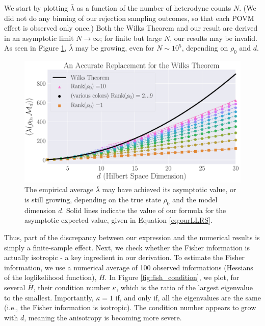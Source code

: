 \documentclass[aps,pra, twocolumn]{revtex4}
\begin{document}
We start by plotting $\bar{\lambda}$ as a function of the number of heterodyne counts $N$. (We did not do any binning of our rejection sampling outcomes, so that each POVM effect is observed only once.) Both the Wilks 
Theorem and our result are derived in an asymptotic limit $N \rightarrow \infty$; for finite but large $N$, our results may be invalid. 
As seen in Figure \ref{fig:totalcontrib}, $\bar{\lambda}$ may be growing, even for $N \sim 10^{5}$, depending on $\rho_{0}$ and $d$.
\begin{figure}[h]
  \includegraphics[width=\columnwidth]{Images/Figure_9.pdf}
 \caption{The empirical average $\bar{\lambda}$  may have achieved its asymptotic value, or is still 
growing, depending on the true state $\rho_{0}$ and the model dimension $d$. Solid lines indicate the value of our formula
for the asymptotic expected value, given in Equation \eqref{eq:ourLLRS}.}
\label{fig:totalcontrib}
\end{figure}

Thus, part of the discrepancy between our expression and the numerical results is simply a finite-sample effect. Next, we check 
whether the Fisher information is actually isotropic - a key ingredient in our derivation. To estimate the Fisher information, we use a numerical average of 100 observed informations (Hessians of the loglikelihood function), $\bar{H}$. In  Figure \ref{fig:fish_condition}, we plot, for several $\bar{H}$, their condition number $\kappa$, which is the ratio of the largest eigenvalue to the smallest. Importantly, $\kappa = 1$ if, and only if, all the eigenvalues are the same (i.e., the Fisher information is isotropic). The condition number appears to grow with $d$, meaning the anisotropy is becoming more severe.
\end{document}
